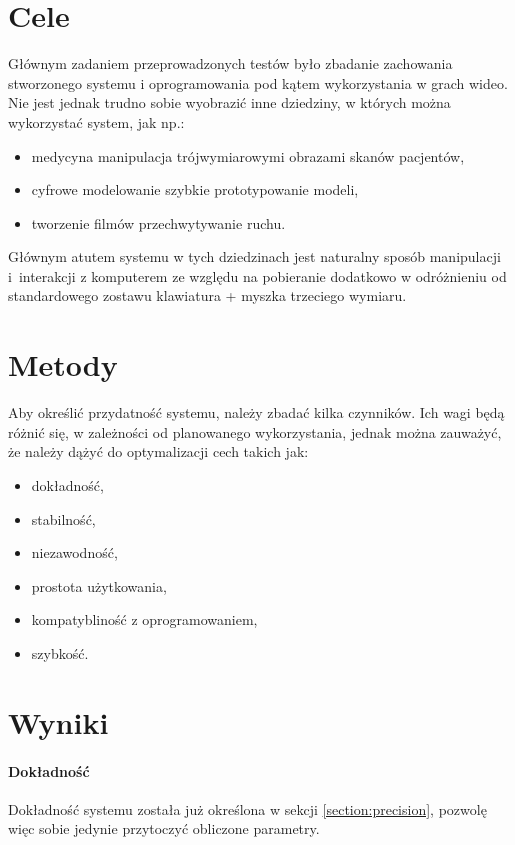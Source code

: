 \label{ch:tests}

\section{Cele}

Głównym zadaniem przeprowadzonych testów było zbadanie zachowania stworzonego systemu i oprogramowania pod kątem wykorzystania w grach wideo. Nie jest jednak trudno sobie wyobrazić inne dziedziny, w których można wykorzystać system, jak np.:
\begin{itemize}
 \item medycyna \ppauza manipulacja trójwymiarowymi obrazami skanów pacjentów,
 \item cyfrowe modelowanie \ppauza szybkie prototypowanie modeli,
 \item tworzenie filmów \ppauza przechwytywanie ruchu.
\end{itemize}

Głównym atutem systemu w tych dziedzinach jest naturalny sposób manipulacji i~interakcji z komputerem ze względu na pobieranie dodatkowo \ppauza w odróżnieniu od standardowego zostawu klawiatura + myszka \ppauza trzeciego wymiaru.

\section{Metody}
Aby określić przydatność systemu, należy zbadać kilka czynników. Ich wagi będą różnić się, w zależności od planowanego wykorzystania, jednak można zauważyć, że należy dążyć do optymalizacji cech takich jak:
\begin{itemize}
 \item dokładność,
 \item stabilność,
 \item niezawodność,
 \item prostota użytkowania,
 \item kompatybliność z oprogramowaniem,
 \item szybkość.
\end{itemize}


\section{Wyniki}
\paragraph{Dokładność}
Dokładność systemu została już określona w sekcji \ref{section:precision}, pozwolę więc sobie jedynie przytoczyć obliczone parametry.

